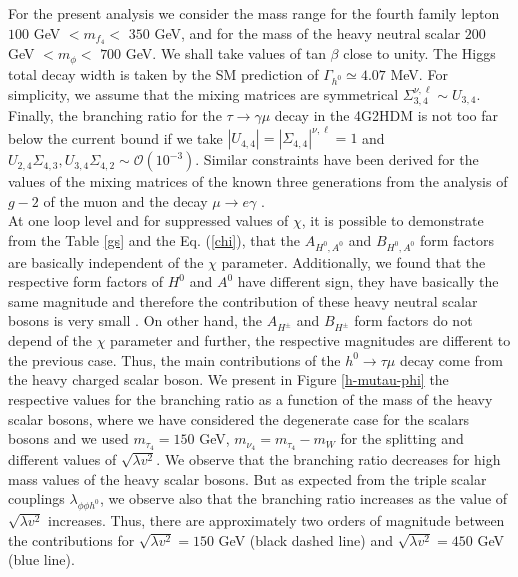 \documentclass[a4paper]{jpconf}
\begin{document}
 For the present analysis we  consider the mass range for  the fourth family lepton $100$ GeV $< m_{f_4} <$ $350$ GeV, and for the mass of the heavy neutral scalar $200$ GeV $<m_\phi<$ $700$ GeV. We shall take values of tan $ \beta $ close to unity. The Higgs total decay width is taken by the SM prediction of $\Gamma_{h^{0}}\simeq 4.07 $ MeV. For simplicity, we assume that the mixing matrices are symmetrical $\Sigma_{3,4}^{\nu,\ell}\sim U_{3,4}$. Finally, the branching ratio for the $\tau\to \gamma \mu$  decay in the 4G2HDM is not too far below the current bound \cite{BarShalom:2011bb} if we take $|U_{4,4}|=|\Sigma_{4,4}|^{\nu,\ell}=1$ and $U_{2,4}\Sigma_{4,3},U_{3,4}\Sigma_{4,2}\sim \mathcal{O}(10^{-3})$. Similar constraints have been derived for the values of the mixing matrices of the known three generations
from the analysis of $ g-2 $ of the muon and the decay $ \mu\rightarrow e \gamma $ \cite{BarShalom:2011bb,Lindner:2016bgg}.\\
 At one loop level and for suppressed values of $\chi$, it is possible to demonstrate from the Table \ref{gs} and the Eq. (\ref{chi}), that the $A_{H^0,A^0}$ and $B_{H^0,A^0}$ form factors are basically independent of the $\chi$ parameter. Additionally, we found that the respective form factors of $H^0$ and $A^0$ have different sign, they have basically the same magnitude and therefore the contribution of these heavy neutral scalar bosons is very small \cite{Moyotl2017205}. On other hand, the $A_{H^\pm}$ and $B_{H^\pm}$ form factors do not depend of the $\chi$ parameter and further, the respective magnitudes are different to the previous case. Thus, the main contributions of the $h^0 \to \tau \mu$ decay come from the heavy charged scalar boson. We present in Figure \ref{h-mutau-phi} the respective values for the branching ratio as a function of the mass of the heavy scalar bosons, where we have considered the degenerate case for the scalars bosons and we used $m_{\tau_4}=150$ GeV, $m_{\nu_4}=m_{\tau_4}-m_W$ for the splitting and different values of $\sqrt{\lambda v^2}$. We observe that the branching ratio decreases for high mass values of the heavy scalar bosons. But as expected from the triple scalar couplings $\lambda_{\phi\phi h^0}$, we observe also that the branching ratio increases as the value of $\sqrt{\lambda v^2}$ increases. Thus, there are approximately  two orders of magnitude between the contributions for $\sqrt{\lambda v^2}=150$ GeV (black dashed line) and $\sqrt{\lambda v^2}=450$ GeV (blue line).\\
\end{document}
